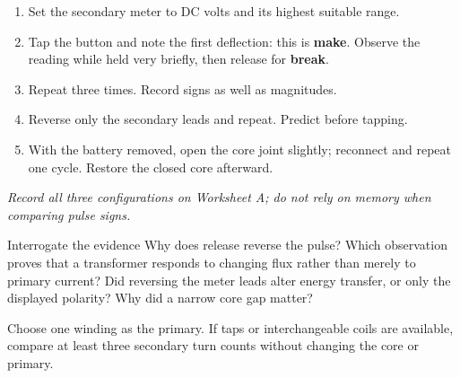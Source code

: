 \begin{enumerate}
\item Set the secondary meter to DC volts and its highest suitable range.
\item Tap the button and note the first deflection: this is \textbf{make}.
Observe the reading while held very briefly, then release for \textbf{break}.
\item Repeat three times. Record signs as well as magnitudes.
\item Reverse only the secondary leads and repeat. Predict before tapping.
\item With the battery removed, open the core joint slightly; reconnect and
repeat one cycle. Restore the closed core afterward.
\end{enumerate}

\textit{Record all three configurations on Worksheet A; do not rely on memory
when comparing pulse signs.}

\begin{teloscard}{Interrogate the evidence}
Why does release reverse the pulse? Which observation proves that a transformer
responds to changing flux rather than merely to primary current? Did reversing
the meter leads alter energy transfer, or only the displayed polarity? Why did
a narrow core gap matter?
\end{teloscard}

\begin{center}
\end{center}

\newpage
{}

Choose one winding as the primary. If taps or interchangeable coils are
available, compare at least three secondary turn counts without changing the
core or primary.

